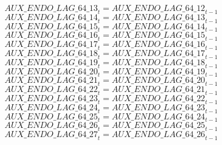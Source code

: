 \begin{dmath}
{AUX\_ENDO\_LAG\_64\_13}_{t}={AUX\_ENDO\_LAG\_64\_12}_{t-1}
\end{dmath}
\begin{dmath}
{AUX\_ENDO\_LAG\_64\_14}_{t}={AUX\_ENDO\_LAG\_64\_13}_{t-1}
\end{dmath}
\begin{dmath}
{AUX\_ENDO\_LAG\_64\_15}_{t}={AUX\_ENDO\_LAG\_64\_14}_{t-1}
\end{dmath}
\begin{dmath}
{AUX\_ENDO\_LAG\_64\_16}_{t}={AUX\_ENDO\_LAG\_64\_15}_{t-1}
\end{dmath}
\begin{dmath}
{AUX\_ENDO\_LAG\_64\_17}_{t}={AUX\_ENDO\_LAG\_64\_16}_{t-1}
\end{dmath}
\begin{dmath}
{AUX\_ENDO\_LAG\_64\_18}_{t}={AUX\_ENDO\_LAG\_64\_17}_{t-1}
\end{dmath}
\begin{dmath}
{AUX\_ENDO\_LAG\_64\_19}_{t}={AUX\_ENDO\_LAG\_64\_18}_{t-1}
\end{dmath}
\begin{dmath}
{AUX\_ENDO\_LAG\_64\_20}_{t}={AUX\_ENDO\_LAG\_64\_19}_{t-1}
\end{dmath}
\begin{dmath}
{AUX\_ENDO\_LAG\_64\_21}_{t}={AUX\_ENDO\_LAG\_64\_20}_{t-1}
\end{dmath}
\begin{dmath}
{AUX\_ENDO\_LAG\_64\_22}_{t}={AUX\_ENDO\_LAG\_64\_21}_{t-1}
\end{dmath}
\begin{dmath}
{AUX\_ENDO\_LAG\_64\_23}_{t}={AUX\_ENDO\_LAG\_64\_22}_{t-1}
\end{dmath}
\begin{dmath}
{AUX\_ENDO\_LAG\_64\_24}_{t}={AUX\_ENDO\_LAG\_64\_23}_{t-1}
\end{dmath}
\begin{dmath}
{AUX\_ENDO\_LAG\_64\_25}_{t}={AUX\_ENDO\_LAG\_64\_24}_{t-1}
\end{dmath}
\begin{dmath}
{AUX\_ENDO\_LAG\_64\_26}_{t}={AUX\_ENDO\_LAG\_64\_25}_{t-1}
\end{dmath}
\begin{dmath}
{AUX\_ENDO\_LAG\_64\_27}_{t}={AUX\_ENDO\_LAG\_64\_26}_{t-1}
\end{dmath}
